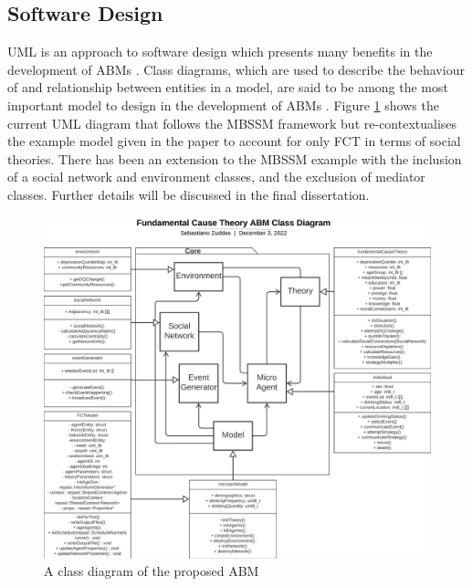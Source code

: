 \subsection{Software Design}
\ac{UML} is an approach to software design which presents many benefits in the development of \ac{ABM}s \cite{UMLABM}. Class diagrams, which are used to describe the behaviour of and relationship between entities in a model, are said to be among the most important model to design in the development of \ac{ABM}s \cite{UMLABM}. Figure \ref{fig:fctUML} shows the current \ac{UML} diagram that follows the \ac{MBSSM} framework but re-contextualises the example model given in the paper to account for only \ac{FCT} in terms of social theories. There has been an extension to the \ac{MBSSM} example with the inclusion of a social network and environment classes, and the exclusion of mediator classes. Further details will be discussed in the final dissertation.

\begin{figure}[h]
\centering
\includegraphics[width=\linewidth]{figures/Class Diagram FYP December.png}
\caption{A class diagram of the proposed ABM}
\label{fig:fctUML}
\end{figure}




